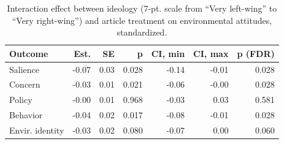 \begin{table}[h!t]
\centering
\begin{tabular}{lrrrrrr}
  \hline
Outcome & Est. & SE & p & CI, min & CI, max & p (FDR) \\ 
  \hline
Salience & -0.07 & 0.03 & 0.028 & -0.14 & -0.01 & 0.028 \\ 
  Concern & -0.03 & 0.01 & 0.021 & -0.06 & -0.00 & 0.028 \\ 
  Policy & -0.00 & 0.01 & 0.968 & -0.03 & 0.03 & 0.581 \\ 
  Behavior & -0.04 & 0.02 & 0.017 & -0.08 & -0.01 & 0.028 \\ 
  Envir. identity & -0.03 & 0.02 & 0.080 & -0.07 & 0.00 & 0.060 \\ 
   \hline
\end{tabular}
\caption{Interaction effect between ideology (7-pt. scale from ``Very left-wing'' to ``Very right-wing'')
                   and article treatment on environmental attitudes, standardized.} 
\label{tab:main_effects_ideo_hetero}
\end{table}
